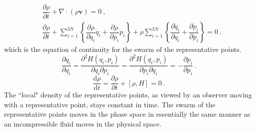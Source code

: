 \documentclass[12pt,a4paper]{article}
\renewcommand{\vec}[1]{\boldsymbol{#1}}
\newcommand{\dif}{\mathrm{d}}
\begin{document}
\begin{align}
& \dfrac{\partial \rho}{\partial t} + \nabla \cdot ( \rho \vec{v}) = 0 ~, \\
& \dfrac{\partial \rho}{\partial t} +\sum_{i=1}^{3N} \left\{\dfrac{\partial \rho}{\partial q_i} \dot{q}_i +\dfrac{\partial \rho}{\partial p_i} \dot{p}_i\right\} + \rho \sum_{i=1}^{3N} \left\{\dfrac{\partial \dot{q}_i}{\partial q_i} +\dfrac{\partial \dot{p}_i}{\partial p_i} \right\} = 0 ~.
\end{align}
which is the equation of continuity for the swarm of the representative points.
\begin{equation*}
\dfrac{\partial \dot{q}_i}{\partial q_i} = \dfrac{\partial^2 H(q_i, p_i)}{\partial q_i \partial p_i} = \dfrac{\partial^2 H(q_i, p_i)}{\partial p_i \partial q_i} = - \dfrac{\partial \dot{p}_i}{\partial p_i} ~.
\end{equation*}
\begin{equation}
\dfrac{\dif \rho}{\dif t} = \dfrac{\partial \rho}{\partial t} +[\rho, H]  = 0 ~.
\end{equation}
The ``local" density of the representative points, as viewed by an observer moving with a representative point, stays constant in time. The swarm of the representative points moves in the phase space in essentially the same manner as an incompressible fluid moves in the physical space.
\end{document}
